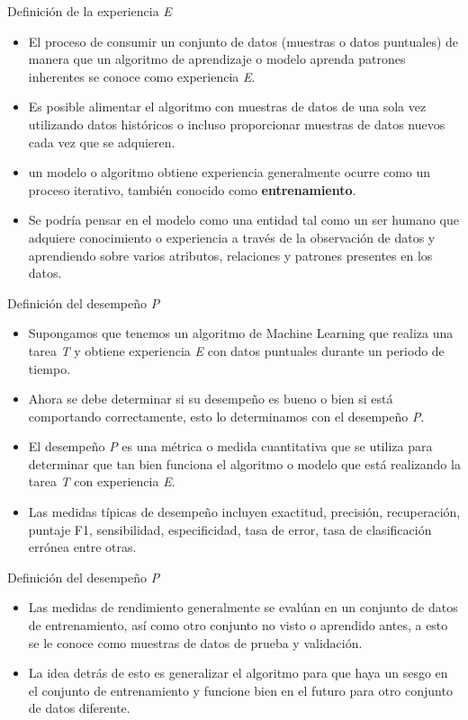 \documentclass[11pt,aspectratio=169]{beamer}
\begin{document}
\begin{frame}{Definición de la experiencia \textit{E}}
\begin{itemize}
	\item El proceso de consumir un conjunto de datos (muestras o datos puntuales) de manera que un algoritmo de aprendizaje o modelo aprenda patrones inherentes
		se conoce como experiencia \textit{E}.\pause
	\item Es posible alimentar el algoritmo con muestras de datos de una sola vez utilizando datos históricos o incluso proporcionar muestras de datos nuevos
		cada vez que se adquieren.\pause
	\item un modelo o algoritmo obtiene experiencia generalmente ocurre como un proceso iterativo, también conocido como \textbf{entrenamiento}. \pause
	\item Se podría pensar en el modelo como una entidad tal como un ser humano que adquiere conocimiento o experiencia a través de la observación de datos y 
		aprendiendo sobre varios atributos, relaciones y patrones presentes en los datos. 
\end{itemize}
\end{frame}

\begin{frame}{Definición del desempeño \textit{P}}
\begin{itemize}
	\item Supongamos que tenemos un algoritmo de Machine Learning que realiza una tarea \textit{T} y obtiene experiencia \textit{E} con datos puntuales 
		durante un periodo de tiempo.\pause
	\item Ahora se debe determinar si su desempeño es bueno o bien si está comportando correctamente, esto lo determinamos con el desempeño \textit{P}.\pause
	\item El desempeño \textit{P} es una métrica o medida cuantitativa que se utiliza para determinar que tan bien funciona el algoritmo o modelo que está 
		realizando la tarea \textit{T} con experiencia \textit{E}.\pause
	\item Las medidas típicas de desempeño incluyen exactitud, precisión, recuperación, puntaje F1, sensibilidad, especificidad, tasa de error, tasa de 
		clasificación errónea entre otras.
\end{itemize}
\end{frame}

\begin{frame}{Definición del desempeño \textit{P}}
\begin{itemize}
	\item Las medidas de rendimiento generalmente se evalúan en un conjunto de datos de entrenamiento, así como otro conjunto no visto o aprendido antes, 
		a esto se le conoce como muestras de datos de prueba y validación.\pause
	\item La idea detrás de esto es generalizar el algoritmo para que haya un sesgo en el conjunto de entrenamiento y funcione bien en el futuro para otro 
		conjunto de datos diferente.
\end{itemize}
\end{frame}
  
\end{document}
